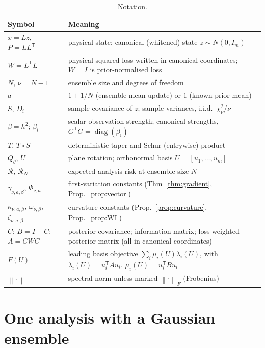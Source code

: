 \documentclass[11pt,a4paper]{article}
\numberwithin{equation}{section}
\theoremstyle{remark}\newtheorem{remark}[theorem]{Remark}
\newcommand{\diag}{\operatorname{diag}}
\newcommand{\risk}{\mathcal R}
\newcommand{\T}{^{\mathsf T}}
\newcommand{\norm}[1]{\left\lVert#1\right\rVert}
\begin{document}
\begin{table}[ht]
\centering
\caption{Notation.}
\label{tab:notation}
\small
\begin{tabularx}{\linewidth}{>{\raggedright\arraybackslash}p{3.3cm}X}
\toprule
Symbol & Meaning\\
\midrule
\(x=Lz\), \(P=LL\T\) & physical state; canonical (whitened) state \(z\sim N(0,I_m)\)\\
\(W=L\T L\) & physical squared loss written in canonical coordinates; \(W=I\) is
 prior-normalised loss\\
\(N\), \(\nu=N-1\) & ensemble size and degrees of freedom\\
\(a\) & \(1+1/N\) (ensemble-mean update) or \(1\) (known prior mean)\\
\(S\), \(D_i\) & sample covariance of \(z\); sample variances, i.i.d.\ \(\chi^2_\nu/\nu\)\\
\(\beta=h^2\); \(\beta_i\) & scalar observation strength; canonical strengths, \(G\T G=\diag(\beta_i)\)\\
\(T\), \(T\circ S\) & deterministic taper and Schur (entrywise) product\\
\(Q_\theta\), \(U\) & plane rotation; orthonormal basis \(U=[u_1,\ldots,u_m]\)\\
\(\risk\), \(\risk_N\) & expected analysis risk at ensemble size \(N\)\\
\(\gamma_{\nu,a,\beta}\), \(\Phi_{\nu,a}\) & first-variation constants (Thm~\ref{thm:gradient}, Prop.~\ref{prop:vector})\\
\(\kappa_{\nu,a,\beta}\), \(\omega_{\nu,\beta}\), \(\zeta_{\nu,a,\beta}\) & curvature constants (Prop.~\ref{prop:curvature}, Prop.~\ref{prop:WI})\\
\(C\); \(B=I-C\); \(A=CWC\) & posterior covariance; information matrix; loss-weighted posterior
 matrix (all in canonical coordinates)\\
\(F(U)\) & leading basis objective \(\sum_i\mu_i(U)\lambda_i(U)\), with \(\lambda_i(U)=u_i\T Au_i\),
 \(\mu_i(U)=u_i\T Bu_i\)\\
\(\norm{\cdot}\) & spectral norm unless marked \(\norm{\cdot}_F\) (Frobenius)\\
\bottomrule
\end{tabularx}
\end{table}

\section{One analysis with a Gaussian ensemble}\label{sec:setting}
\end{document}
